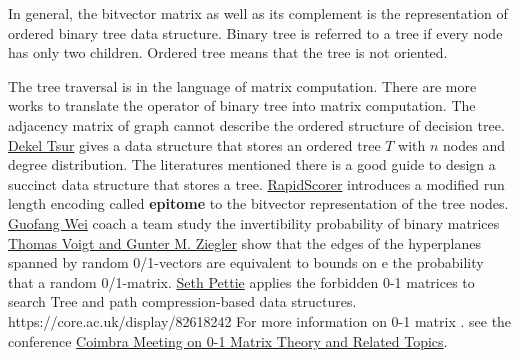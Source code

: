 \documentclass[UTF8]{article}
\begin{document}
In general, the bitvector matrix as well as its complement is the representation of ordered binary tree data structure.
Binary tree is referred to a tree if every node has only two children.
Ordered tree means that the tree is not oriented.


The tree traversal is in the language of matrix computation.
There are more works to translate the operator of binary tree into matrix computation.
The adjacency matrix of graph cannot describe the  ordered structure of decision tree.
\href{https://arxiv.org/pdf/1807.00371.pdf}{Dekel Tsur} gives a data structure
that stores an ordered tree $T$ with $n$ nodes and degree distribution.
The literatures mentioned there is a good guide
to design a succinct data structure that stores a tree.
\href{http://ai.stanford.edu/~wzou/kdd_rapidscorer.pdf}{RapidScorer}
introduces a modified run length encoding called \textbf{epitome} to the bitvector representation of the tree nodes.
\href{https://pdfs.semanticscholar.org/b85f/da059a6aa272ded62a467e5c735dd53183b5.pdf}{ Guofang Wei}
coach a team study the invertibility probability of binary matrices
\href{https://arxiv.org/abs/math/0308050}{Thomas Voigt and Gunter M. Ziegler}
show that the edges of the  hyperplanes spanned by random 0/1-vectors are equivalent to bounds on e the probability that a random 0/1-matrix.
\href{http://web.eecs.umich.edu/~pettie/}{Seth Pettie}
applies the forbidden 0-1 matrices to search Tree
and path compression-based data structures.
https://core.ac.uk/display/82618242
For more information on 0-1 matrix .
see the conference \href{http://www.mat.uc.pt/~cmf/01MatrixTheory2010/invited_speakers.html}{Coimbra Meeting on
0-1 Matrix Theory and Related Topics}.
\end{document}
